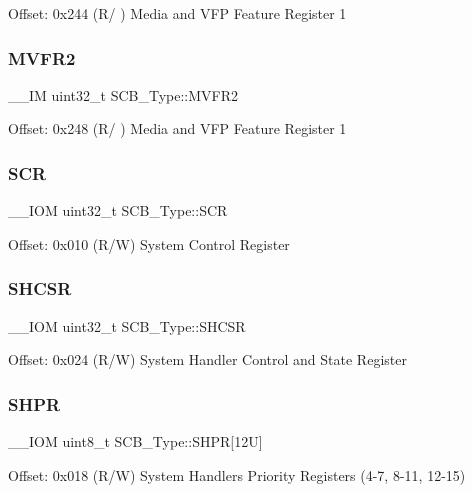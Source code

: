 Offset\+: 0x244 (R/ ) Media and V\+FP Feature Register 1 \mbox{\label{structSCB__Type_a280ef961518ecee3ed43a86404853c3d}} 
\subsubsection{\texorpdfstring{MVFR2}{MVFR2}}
{\footnotesize\ttfamily \+\_\+\+\_\+\+IM uint32\+\_\+t S\+C\+B\+\_\+\+Type\+::\+M\+V\+F\+R2}

Offset\+: 0x248 (R/ ) Media and V\+FP Feature Register 1 \mbox{\label{structSCB__Type_a3a4840c6fa4d1ee75544f4032c88ec34}} 
\subsubsection{\texorpdfstring{SCR}{SCR}}
{\footnotesize\ttfamily \+\_\+\+\_\+\+I\+OM uint32\+\_\+t S\+C\+B\+\_\+\+Type\+::\+S\+CR}

Offset\+: 0x010 (R/W) System Control Register \mbox{\label{structSCB__Type_a7b5ae9741a99808043394c4743b635c4}} 
\subsubsection{\texorpdfstring{SHCSR}{SHCSR}}
{\footnotesize\ttfamily \+\_\+\+\_\+\+I\+OM uint32\+\_\+t S\+C\+B\+\_\+\+Type\+::\+S\+H\+C\+SR}

Offset\+: 0x024 (R/W) System Handler Control and State Register \mbox{\label{structSCB__Type_afdab23abd301033bb318c7b188b377db}} 
\subsubsection{\texorpdfstring{SHPR}{SHPR}}
{\footnotesize\ttfamily \+\_\+\+\_\+\+I\+OM uint8\+\_\+t S\+C\+B\+\_\+\+Type\+::\+S\+H\+PR\mbox{[}12\+U\mbox{]}}

Offset\+: 0x018 (R/W) System Handlers Priority Registers (4-\/7, 8-\/11, 12-\/15) \mbox{\label{structSCB__Type_ad70825dd0869b7ccd07fb2b8680fcdb6}} 
